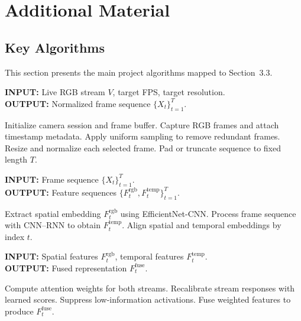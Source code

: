 \appendix
\chapter{Additional Material}

\renewcommand{\thealgorithm}{A\thechapter.\arabic{algorithm}}

\section{Key Algorithms}
This section presents the main project algorithms mapped to Section~3.3.

\begin{algorithm}[H]
\caption{Input Capture and Preprocessing}
\label{alg:acq-pre}
\begin{flushleft}\small
\textbf{INPUT:} Live RGB stream $V$, target FPS, target resolution.\\
\textbf{OUTPUT:} Normalized frame sequence $\{X_t\}_{t=1}^{T}$.
\end{flushleft}
\begin{algorithmic}[1]\footnotesize
\State Initialize camera session and frame buffer.
\State Capture RGB frames and attach timestamp metadata.
\State Apply uniform sampling to remove redundant frames.
\State Resize and normalize each selected frame.
\State Pad or truncate sequence to fixed length $T$.
\end{algorithmic}
\end{algorithm}

\begin{algorithm}[H]
\caption{Dual-Stream Feature Extraction}
\label{alg:dual-stream}
\begin{flushleft}\small
\textbf{INPUT:} Frame sequence $\{X_t\}_{t=1}^{T}$.\\
\textbf{OUTPUT:} Feature sequences $\{F_t^{\mathrm{rgb}}, F_t^{\mathrm{temp}}\}_{t=1}^{T}$.
\end{flushleft}
\begin{algorithmic}[1]\footnotesize
{}
	\State Extract spatial embedding $F_t^{\mathrm{rgb}}$ using EfficientNet-CNN.
\EndFor
\State Process frame sequence with CNN--RNN to obtain $F_t^{\mathrm{temp}}$.
\State Align spatial and temporal embeddings by index $t$.
\end{algorithmic}
\end{algorithm}

\begin{algorithm}[H]
\caption{Attention Weighting and Fusion}
\label{alg:attn-fuse}
\begin{flushleft}\small
\textbf{INPUT:} Spatial features $F_t^{\mathrm{rgb}}$, temporal features $F_t^{\mathrm{temp}}$.\\
\textbf{OUTPUT:} Fused representation $F_t^{\mathrm{fuse}}$.
\end{flushleft}
\begin{algorithmic}[1]\footnotesize
{}
	\State Compute attention weights for both streams.
	\State Recalibrate stream responses with learned scores.
	\State Suppress low-information activations.
	\State Fuse weighted features to produce $F_t^{\mathrm{fuse}}$.
\EndFor
\end{algorithmic}
\end{algorithm}

